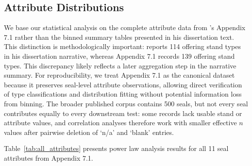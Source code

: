 \documentclass[12pt]{article}
\begin{document}
\subsection{Attribute Distributions}
\label{subsec:attributes}

We base our statistical analysis on the complete attribute data from
\citet{jamison2017}'s Appendix 7.1 rather than the binned summary tables
presented in his dissertation text. This distinction is methodologically
important: \citet{jamison2017} reports 114 offering stand types in his
dissertation narrative, whereas Appendix 7.1 records 139 offering stand
types. This discrepancy likely reflects a later aggregation step in the
narrative summary. For reproducibility, we treat Appendix 7.1 as the canonical
dataset because it preserves seal-level attribute observations, allowing direct
verification of type classifications and distribution fitting without potential
information loss from binning. The broader published corpus contains 500 seals,
but not every seal contributes equally to every downstream test: some records
lack usable stand or attribute values, and correlation analyses therefore work
with smaller effective $n$ values after pairwise deletion of `n/a' and `blank'
entries.

Table~\ref{tab:all_attributes} presents power law analysis results for all 11 seal attributes from Appendix 7.1.
\end{document}
